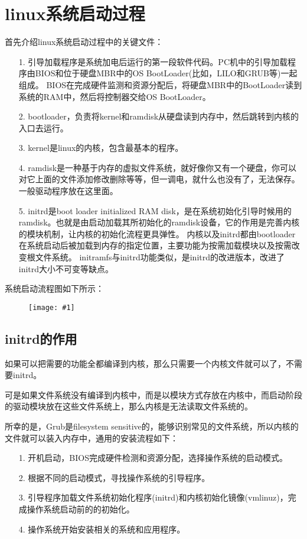 \documentclass[a4paper,left=1.5cm,right=1.5cm,11pt]{article}
\newcommand{\fic}[1]{\begin{figure}[H]
		\center
		\texttt{[image: \#1]}
	\end{figure}}
\begin{document}
\tableofcontents

\clearpage

\section{linux系统启动过程}
	首先介绍linux系统启动过程中的关键文件：
	\begin{itemize}
		\item[1.] 引导加载程序是系统加电后运行的第一段软件代码。PC机中的引导加载程序由BIOS和位于硬盘MBR中的OS BootLoader(比如，LILO和GRUB等)一起组成。
				  BIOS在完成硬件监测和资源分配后，将硬盘MBR中的BootLoader读到系统的RAM中，然后将控制器交给OS BootLoader。
		\item[2.] bootloader，负责将kernel和ramdisk从硬盘读到内存中，然后跳转到内核的入口去运行。
		\item[3.] kernel是linux的内核，包含最基本的程序。
		\item[4.] ramdisk是一种基于内存的虚拟文件系统，就好像你又有一个硬盘，你可以对它上面的文件添加修改删除等等，但一调电，就什么也没有了，无法保存。一般驱动程序放在这里面。
		\item[5.] initrd是boot loader initialized RAM disk，是在系统初始化引导时候用的ramdisk。也就是由启动加载其所初始化的ramdisk设备，它的作用是完善内核的模块机制，让内核的初始化流程更具弹性。
				  内核以及initrd都由bootloader在系统启动后被加载到内存的指定位置，主要功能为按需加载模块以及按需改变根文件系统。
				  initramfs与initrd功能类似，是initrd的改进版本，改进了initrd大小不可变等缺点。
	\end{itemize}

	系统启动流程图如下所示：
	\fic{1.PNG}

\subsection{initrd的作用}
	如果可以把需要的功能全都编译到内核，那么只需要一个内核文件就可以了，不需要initrd。\par

	可是如果文件系统没有编译到内核中，而是以模块方式存放在内核中，而启动阶段的驱动模块放在这些文件系统上，那么内核是无法读取文件系统的。\par

	所幸的是，Grub是filesystem sensitive的，能够识别常见的文件系统，所以内核的文件就可以装入内存中，通用的安装流程如下：
	\begin{itemize}
		\item[1.] 开机启动，BIOS完成硬件检测和资源分配，选择操作系统的启动模式。
		\item[2.] 根据不同的启动模式，寻找操作系统的引导程序。
		\item[3.] 引导程序加载文件系统初始化程序(initrd)和内核初始化镜像(vmlinuz)，完成操作系统启动前的的初始化。
		\item[4.] 操作系统开始安装相关的系统和应用程序。
	\end{itemize}
\end{document}
